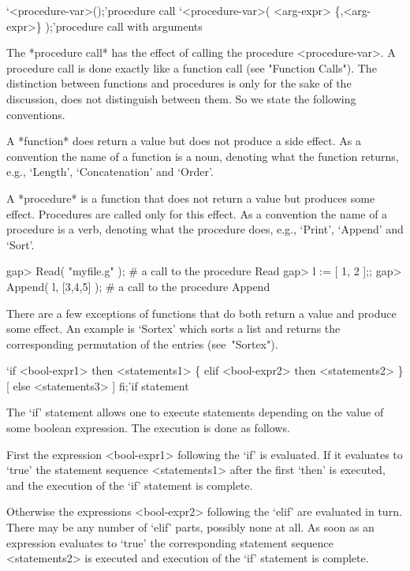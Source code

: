 {%

\>`<procedure-var>();'{procedure call}
\>`<procedure-var>( <arg-expr> \{,<arg-expr>\} );'{procedure call with arguments}

The *procedure call* has  the  effect  of calling  the procedure
<procedure-var>.  A procedure call is done exactly like a function call
(see "Function Calls"). The distinction between functions and procedures
is only for the sake of the discussion, {\GAP} does not distinguish
between them.
So we state the following conventions.

A *function* does return a value but does not produce a side effect. As
a convention the name of a function is a noun, denoting what the function
returns, e.g., `Length', `Concatenation' and `Order'.

A *procedure* is a function that does not return a value but produces
some  effect. Procedures are called  only for  this effect. As  a
convention the name of a procedure is a verb, denoting what the procedure
does, e.g., `Print', `Append' and `Sort'.

\begintt
gap> Read( "myfile.g" );   # a call to the procedure Read
gap> l := [ 1, 2 ];;
gap> Append( l, [3,4,5] );  # a call to the procedure Append
\endtt

There are a few exceptions of {\GAP} functions that do both return
a value and produce some effect.
An example is `Sortex' which sorts a list and returns the corresponding
permutation of the entries (see~"Sortex").


\>`if <bool-expr1> then <statements1> \{ elif <bool-expr2> then <statements2> \}[ else <statements3> ] fi;'{if statement}

The `if' statement allows one to execute statements depending on the
value of some boolean expression. The execution is done as follows.

First the expression <bool-expr1> following the `if' is evaluated. If it
evaluates to `true' the statement sequence <statements1> after the first
`then' is executed, and the execution of the `if' statement is complete.

Otherwise the expressions <bool-expr2> following the `elif' are evaluated
in turn. There may be any number of `elif' parts, possibly none at all.
As soon as an expression evaluates to `true' the corresponding statement
sequence <statements2> is executed and execution of the `if' statement is
complete.

}
